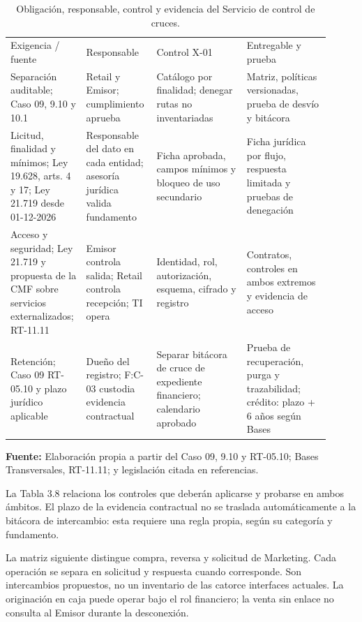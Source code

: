 \documentclass[11pt]{article}
\begin{document}
\begin{longtable}{@{}p{0.19\linewidth}p{0.20\linewidth}p{0.27\linewidth}p{0.25\linewidth}@{}}
\caption{Obligación, responsable, control y evidencia del Servicio de control de cruces.}\label{tab:3-8}\\
\toprule\noalign{}
\endhead
\bottomrule\noalign{}
\endlastfoot
{Exigencia / fuente} & {Responsable} & {Control X-01} & {Entregable y prueba} \\
{Separación auditable; Caso 09, 9.10 y 10.1} & {Retail y Emisor; cumplimiento aprueba} & {Catálogo por finalidad; denegar rutas no inventariadas} & {Matriz, políticas versionadas, prueba de desvío y bitácora} \\
{Licitud, finalidad y mínimos; Ley 19.628, arts. 4 y 17; Ley 21.719 desde 01-12-2026} & {Responsable del dato en cada entidad; asesoría jurídica valida fundamento} & {Ficha aprobada, campos mínimos y bloqueo de uso secundario} & {Ficha jurídica por flujo, respuesta limitada y pruebas de denegación} \\
{Acceso y seguridad; Ley 21.719 y propuesta de la CMF sobre servicios externalizados; RT-11.11} & {Emisor controla salida; Retail controla recepción; TI opera} & {Identidad, rol, autorización, esquema, cifrado y registro} & {Contratos, controles en ambos extremos y evidencia de acceso} \\
{Retención; Caso 09 RT-05.10 y plazo jurídico aplicable} & {Dueño del registro; F:C-03 custodia evidencia contractual} & {Separar bitácora de cruce de expediente financiero; calendario aprobado} & {Prueba de recuperación, purga y trazabilidad; crédito: plazo + 6 años según Bases} \\
\end{longtable}

{\raggedright\textbf{Fuente:} Elaboración propia a partir del Caso 09, 9.10 y RT-05.10; Bases Transversales, RT-11.11; y legislación citada en referencias.\par}

{La Tabla 3.8 relaciona los controles que deberán aplicarse y probarse en ambos ámbitos. El plazo de la evidencia contractual no se traslada automáticamente a la bitácora de intercambio: esta requiere una regla propia, según su categoría y fundamento.}

{La matriz siguiente distingue compra, reversa y solicitud de Marketing. Cada operación se separa en solicitud y respuesta cuando corresponde. Son intercambios propuestos, no un inventario de las catorce interfaces actuales. La originación en caja puede operar bajo el rol financiero; la venta sin enlace no consulta al Emisor durante la desconexión.}
\end{document}
